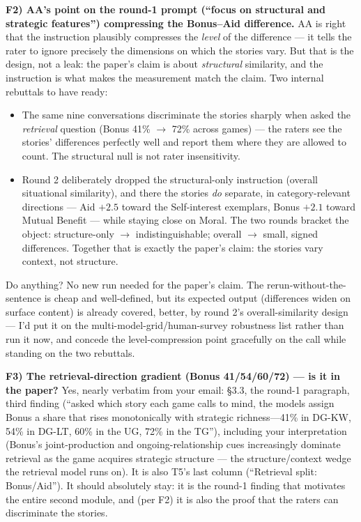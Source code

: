 \documentclass[11pt]{article}
\begin{document}
\textbf{F2) AA's point on the round-1 prompt (``focus on structural and strategic features'') compressing the Bonus--Aid difference.} AA is right that the instruction plausibly compresses the \emph{level} of the difference --- it tells the rater to ignore precisely the dimensions on which the stories vary. But that is the design, not a leak: the paper's claim is about \emph{structural} similarity, and the instruction is what makes the measurement match the claim. Two internal rebuttals to have ready:
\begin{itemize}
\item The same nine conversations discriminate the stories sharply when asked the \emph{retrieval} question (Bonus 41\% $\to$ 72\% across games) --- the raters see the stories' differences perfectly well and report them where they are allowed to count. The structural null is not rater insensitivity.
\item Round 2 deliberately dropped the structural-only instruction (overall situational similarity), and there the stories \emph{do} separate, in category-relevant directions --- Aid $+2.5$ toward the Self-interest exemplars, Bonus $+2.1$ toward Mutual Benefit --- while staying close on Moral. The two rounds bracket the object: structure-only $\to$ indistinguishable; overall $\to$ small, signed differences. Together that is exactly the paper's claim: the stories vary context, not structure.
\end{itemize}
Do anything? No new run needed for the paper's claim. The rerun-without-the-sentence is cheap and well-defined, but its expected output (differences widen on surface content) is already covered, better, by round 2's overall-similarity design --- I'd put it on the multi-model-grid/human-survey robustness list rather than run it now, and concede the level-compression point gracefully on the call while standing on the two rebuttals.

\textbf{F3) The retrieval-direction gradient (Bonus 41/54/60/72) --- is it in the paper?} Yes, nearly verbatim from your email: \S3.3, the round-1 paragraph, third finding (``asked which story each game calls to mind, the models assign Bonus a share that rises monotonically with strategic richness---41\% in DG-KW, 54\% in DG-LT, 60\% in the UG, 72\% in the TG''), including your interpretation (Bonus's joint-production and ongoing-relationship cues increasingly dominate retrieval as the game acquires strategic structure --- the structure/context wedge the retrieval model runs on). It is also T5's last column (``Retrieval split: Bonus/Aid''). It should absolutely stay: it is the round-1 finding that motivates the entire second module, and (per F2) it is also the proof that the raters can discriminate the stories.
\end{document}

